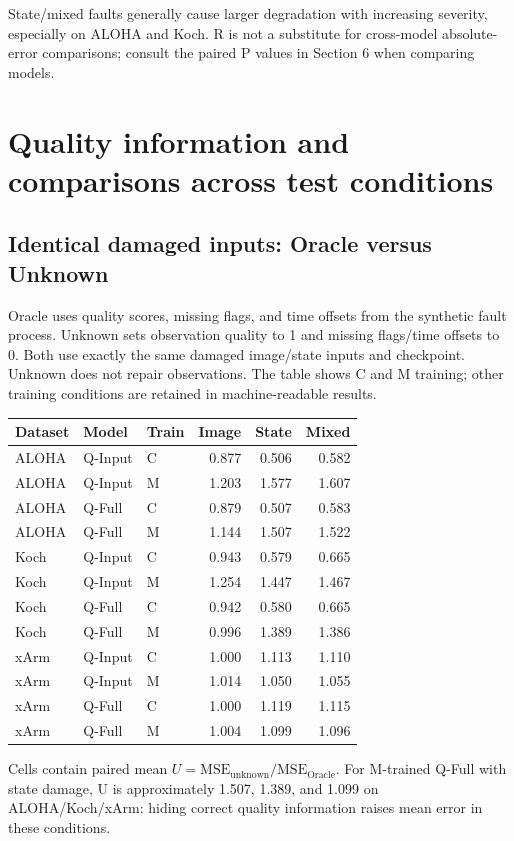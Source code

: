 \documentclass[11pt,a4paper]{article}
\begin{document}
State/mixed faults generally cause larger degradation with increasing severity, especially on ALOHA and Koch. R is not a substitute for cross-model absolute-error comparisons; consult the paired P values in Section 6 when comparing models.
\clearpage\section{Quality information and comparisons across test conditions}
\subsection{Identical damaged inputs: Oracle versus Unknown}
Oracle uses quality scores, missing flags, and time offsets from the synthetic fault process. Unknown sets observation quality to 1 and missing flags/time offsets to 0. Both use exactly the same damaged image/state inputs and checkpoint. Unknown does not repair observations. The table shows C and M training; other training conditions are retained in machine-readable results.

\begin{center}
\small
\begin{tabular}{lllrrr}
\toprule
Dataset & Model & Train & Image & State & Mixed \\
\midrule
ALOHA & Q-Input & C & 0.877 & 0.506 & 0.582 \\
ALOHA & Q-Input & M & 1.203 & 1.577 & 1.607 \\
ALOHA & Q-Full & C & 0.879 & 0.507 & 0.583 \\
ALOHA & Q-Full & M & 1.144 & 1.507 & 1.522 \\
Koch & Q-Input & C & 0.943 & 0.579 & 0.665 \\
Koch & Q-Input & M & 1.254 & 1.447 & 1.467 \\
Koch & Q-Full & C & 0.942 & 0.580 & 0.665 \\
Koch & Q-Full & M & 0.996 & 1.389 & 1.386 \\
xArm & Q-Input & C & 1.000 & 1.113 & 1.110 \\
xArm & Q-Input & M & 1.014 & 1.050 & 1.055 \\
xArm & Q-Full & C & 1.000 & 1.119 & 1.115 \\
xArm & Q-Full & M & 1.004 & 1.099 & 1.096 \\
\bottomrule
\end{tabular}
\end{center}
Cells contain paired mean $U=\mathrm{MSE}_{\mathrm{unknown}}/\mathrm{MSE}_{\mathrm{Oracle}}$. For M-trained Q-Full with state damage, U is approximately 1.507, 1.389, and 1.099 on ALOHA/Koch/xArm: hiding correct quality information raises mean error in these conditions.
\end{document}
